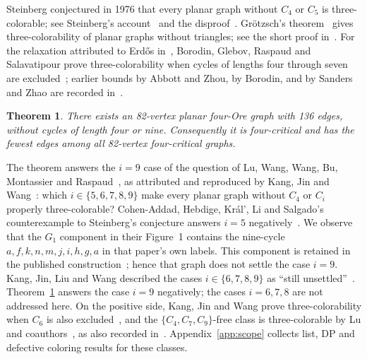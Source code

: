 \documentclass[11pt]{article}
\newtheorem{theorem}{Theorem}
\begin{document}
Steinberg conjectured in 1976 that every planar graph without $C_4$ or
$C_5$ is three-colorable; see Steinberg's account~\cite{steinbergoriginal} and the disproof~\cite[opening paragraph]{steinberg}.
Gr\"otzsch's theorem~\cite{grotzsch} gives three-colorability of planar
graphs without triangles; see the short proof in~\cite{kyfour}. For the
relaxation attributed to Erd\H{o}s in~\cite{kjw}, Borodin, Glebov,
Raspaud and Salavatipour prove three-colorability when cycles of lengths
four through seven are excluded~\cite{bgrs}; earlier bounds by Abbott
and Zhou, by Borodin, and by Sanders and Zhao are recorded
in~\cite[Section~1]{kjw}.

\begin{theorem}\label{thm:main}
There exists an 82-vertex planar four-Ore graph with 136 edges, without cycles of
length four or nine. Consequently it is four-critical and has the fewest
edges among all 82-vertex four-critical graphs.
\end{theorem}

The theorem answers the $i=9$ case of the question of Lu, Wang, Wang,
Bu, Montassier and Raspaud~\cite{lu}, as attributed and reproduced by
Kang, Jin and Wang~\cite[Section~1, Problem~1.2]{kjw}:
which $i\in\{5,6,7,8,9\}$ make every planar graph without $C_4$ or
$C_i$ properly three-colorable? Cohen-Addad, Hebdige, Kr\'al', Li and
Salgado's counterexample to Steinberg's conjecture answers $i=5$
negatively~\cite[Theorem 3]{steinberg}. We observe that the $G_1$
component in their Figure~1 contains the nine-cycle
$a,f,k,n,m,j,i,h,g,a$ in that paper's own labels. This component is
retained in the published construction~\cite[Lemma 2 and proof of
Theorem 3]{steinberg}; hence that graph does not settle the case $i=9$.
Kang, Jin, Liu and Wang described the cases $i\in\{6,7,8,9\}$ as
``still unsettled''~\cite[paragraph following Problem 1.2]{jklw}.
Theorem~\ref{thm:main} answers the case $i=9$ negatively; the cases
$i=6,7,8$ are not addressed here. On the positive side, Kang, Jin and
Wang prove three-colorability when $C_6$ is also
excluded~\cite[Theorem 1.4]{kjw}, and the $\{C_4,C_7,C_9\}$-free class is
three-colorable by Lu and coauthors~\cite{lu}, as also recorded
in~\cite[Section 1, paragraph following Problem 1.3]{kjw}.
Appendix~\ref{app:scope} collects list, DP and defective coloring results
for these classes.
\end{document}
